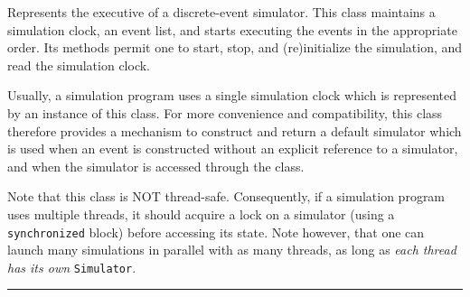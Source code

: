 
Represents the executive of a discrete-event simulator.
This class maintains a simulation
clock, an event list, and starts executing the events
in the appropriate order.
Its methods permit one to start, stop, and (re)initialize the simulation,
and read the simulation clock.

Usually, a simulation program uses a single simulation clock which is
represented by an instance of this class.
For more convenience and compatibility, this class therefore provides
a mechanism to construct and return a default simulator
which is used when an event is constructed without an explicit reference to a
simulator, and when the simulator is accessed through
the  class.

Note that this class is NOT thread-safe.  Consequently, if a simulation program
uses multiple threads, it should acquire a lock on a simulator (using a
\texttt{synchronized} block) before accessing its state.
Note however, that one can launch many simulations in parallel with as many
threads, as long as \emph{each thread has its own} \texttt{Simulator}.


\bigskip\hrule

